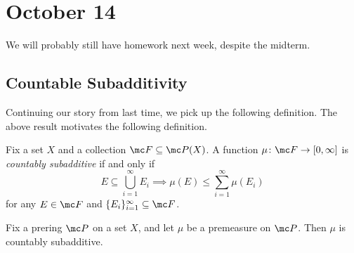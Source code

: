 \documentclass[../notes.tex]{subfiles}
\begin{document}
\section{October 14}

We will probably still have homework next week, despite the midterm.

\subsection{Countable Subadditivity}
Continuing our story from last time, we pick up the following definition.
The above result motivates the following definition.
\begin{definition}
	Fix a set $X$ and a collection $\mc F\subseteq\mc P(X)$. A function $\mu\colon\mc F\to[0,\infty]$ is \textit{countably subadditive} if and only if
	\[E\subseteq\bigcup_{i=1}^\infty E_i\implies\mu(E)\le\sum_{i=1}^\infty\mu(E_i)\]
	for any $E\in\mc F$ and $\{E_i\}_{i=1}^\infty\subseteq\mc F$.
\end{definition}
\begin{lemma} \label{lem:premeas-is-countable-subadd}
	Fix a prering $\mc P$ on a set $X$, and let $\mu$ be a premeasure on $\mc P$. Then $\mu$ is countably subadditive.
\end{lemma}
\end{document}
